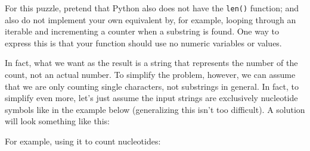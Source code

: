 For this puzzle, pretend that Python also does not have the
\texttt{len()} function; and also do not implement your own equivalent
by, for example, looping through an iterable and incrementing a counter
when a substring is found. One way to express this is that your function
should use no numeric variables or values.

In fact, what we want as the result is a string that represents the
number of the count, not an actual number. To simplify the problem,
however, we can assume that we are only counting single characters, not
substrings in general. In fact, to simplify even more, let's just assume
the input strings are exclusively nucleotide symbols like in the example
below (generalizing this isn't too difficult). A solution will look
something like this:

\begin{Shaded}
\begin{Highlighting}[]
\OperatorTok{\textgreater{}\textgreater{}\textgreater{}} \NormalTok{) }\OperatorTok{{-}\textgreater{}} \NormalTok{:}
\end{Highlighting}
\end{Shaded}

For example, using it to count nucleotides:

\begin{Shaded}
\begin{Highlighting}[]
\OperatorTok{\textgreater{}\textgreater{}\textgreater{}}\OperatorTok{=} \StringTok{\textquotesingle{}\textquotesingle{}\textquotesingle{}}
\StringTok{\textquotesingle{}\textquotesingle{}\textquotesingle{}}
\end{Highlighting}
\end{Shaded}

\newpage

